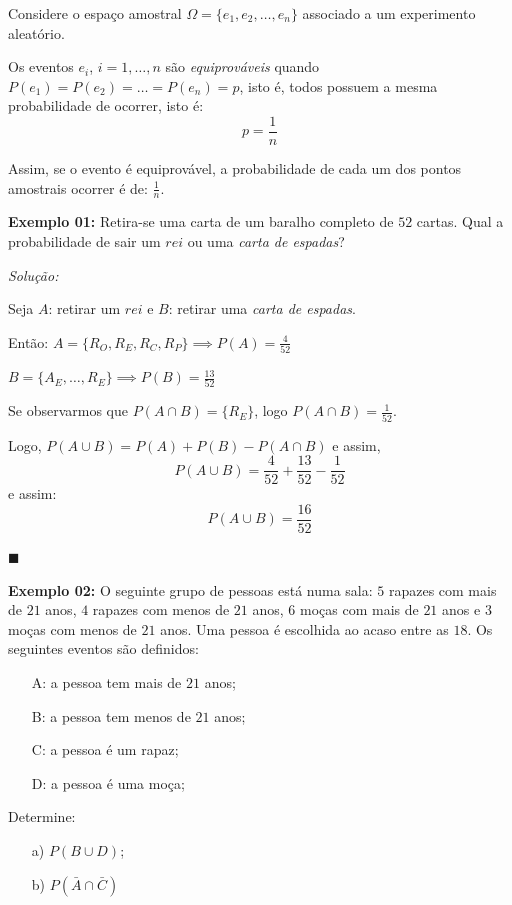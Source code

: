 \documentclass[oneside,a4paper,12pt]{article}
\begin{document}
Considere o espaço amostral $\Omega = \{ e_1, e_2, \dots, e_n\}$ associado a um experimento aleatório.

Os eventos $e_i$, $i=1,\dots,n$ são {\it equiprováveis} quando $P(e_1) = P(e_2) = \dots = P(e_n) = p$, isto é, todos possuem a mesma probabilidade de ocorrer, isto é:
$$p = \frac{1}{n}$$

Assim, se o evento é equiprovável, a probabilidade de cada um dos pontos amostrais ocorrer é de: $\displaystyle \frac{1}{n}$.

{\bf Exemplo 01:} Retira-se uma carta de um baralho completo de $52$ cartas. Qual a probabilidade de sair um $rei$ ou uma {\it carta de espadas}?

{\it Solução:}

Seja $A$: retirar um $rei$ e $B$: retirar uma {\it carta de espadas}.

Então:
$A = \{ R_O, R_E, R_C, R_P\} \implies P(A) = \displaystyle \frac{4}{52}$

$B = \{A_E, \dots, R_E\} \implies P(B) = \displaystyle \frac{13}{52}$

Se observarmos que $P(A \cap B) = \{R_E\}$, logo $P(A \cap B) = \displaystyle \frac{1}{52}$.

Logo, $P(A \cup B) = P(A) + P(B) - P(A \cap B)$ e assim, 
$$P(A \cup B) = \frac{4}{52} + \frac{13}{52} - \frac{1}{52}$$
e assim:
$$P(A \cup B) = \frac{16}{52}$$
\begin{flushright}
	$\blacksquare$
\end{flushright}

{\bf Exemplo 02:} O seguinte grupo de pessoas está numa sala: $5$ rapazes com mais de $21$ anos, $4$ rapazes com menos de $21$ anos, $6$ moças com mais de $21$ anos e $3$ moças com menos de $21$ anos. Uma pessoa é escolhida ao acaso entre as $18$. Os seguintes eventos são definidos:
\begin{enumerate}
	\item[A:] a pessoa tem mais de $21$ anos;
	\item[B:] a pessoa tem menos de $21$ anos;
	\item[C:] a pessoa é um rapaz;
	\item[D:] a pessoa é uma moça;
\end{enumerate}

Determine:
\begin{itemize}
	\item[a)] $P(B \cup D)$;
	\item[b)] $P(\bar{A} \cap \bar{C})$
\end{itemize}
\end{document}
